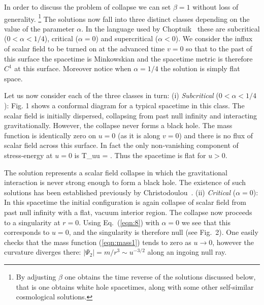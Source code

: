 In order to discuss the problem of collapse we can set $\beta = 1$ without loss
of generality.  \footnote{By adjusting $\beta$ one obtains the time reverse of
the solutions discussed below, that is one obtains white hole spacetimes,
along with some other self-similar cosmological solutions.}
The solutions now fall into three distinct classes depending on
the value of the parameter $\alpha$.  In the language used by
Choptuik~\cite{ref:3}
these are subcritical ($0<\alpha < 1/4$), critical ($\alpha = 0$) and
supercritical ($\alpha <0$).  We consider the influx of scalar field to be
turned on at the advanced time $v=0$ so that to the past of this surface the
spacetime is Minkowskian and the spacetime metric is therefore $C^1$ at this
surface.  Moreover notice when $\alpha = 1/4$ the solution is simply flat
space.

Let us now consider each of the three classes in turn:
\newline
(i) {\it Subcritical} ($0 <\alpha <1/4$):  Fig.  1 shows
a conformal diagram for a typical spacetime in this class.  The scalar field is
initially dispersed, collapsing from past null infinity and interacting
gravitationally.  However, the collapse never forms a black hole.  The mass
function is identically zero on $u=0$ (as it is along $v=0$) and there is no
flux of scalar field across this surface.  In fact the only non-vanishing
component of stress-energy
at $u=0$ is
	\be
	T_{uu} = .
	\ee
Thus the spacetime is flat for $u>0$.

The solution represents a scalar field collapse in which the
gravitational interaction is never strong enough to form a black hole.  The
existence of such solutions has been established previously by
Christodoulou~\cite{ref:1}.
\newline
(ii) {\it Critical} ($\alpha =0$):  In this spacetime
the initial configuration is again collapse of scalar field from past null
infinity with a flat, vacuum interior region.  The collapse now proceeds to a
singularity at $r=0$.  Using Eq.~(\ref{eqn:8}) with $\alpha =0$ we see that
this corresponds to $u=0$,  and the singularity is therefore null (see Fig.~2).
One easily checks that the mass function (\ref{eqn:mass1}) tends to zero as
$u\rightarrow 0$, however the curvature diverges there: $|\Psi_2| = m/r^3 \sim
u^{-3/2}$ along an ingoing null ray.

